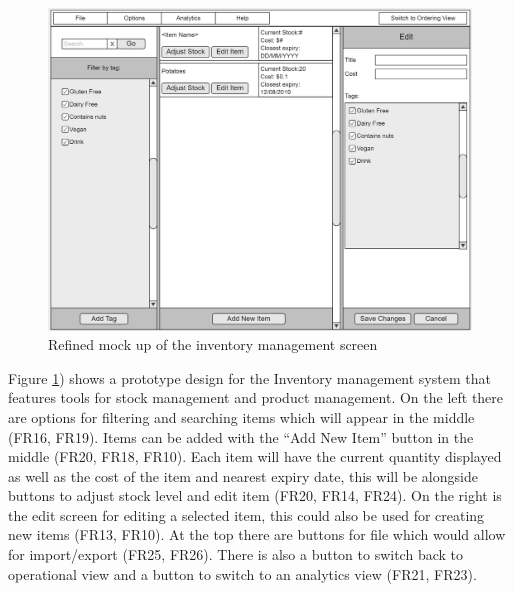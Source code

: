 \begin{figure}[ht]
	\centering
	\includegraphics[width=150mm]{images/GUI_prototypes/Inventory_screen.png}
	\caption{Refined mock up of the inventory management screen}
	\label{fig:management_screen_moqueup}
\end{figure}

Figure \ref{fig:management_screen_moqueup}) shows a prototype design for the Inventory management system that features tools for stock management and product management. On the left there are options for filtering and searching items which will appear in the middle (FR16, FR19). Items can be added with the “Add New Item” button in the middle (FR20, FR18, FR10). Each item will have the current quantity displayed as well as the cost of the item and nearest expiry date, this will be alongside buttons to adjust stock level and edit item (FR20, FR14, FR24). On the right is the edit screen for editing a selected item, this could also be used for creating new items (FR13, FR10). At the top there are buttons for file which would allow for import/export (FR25, FR26). There is also a button to switch back to operational view and a button to switch to an analytics view (FR21, FR23).